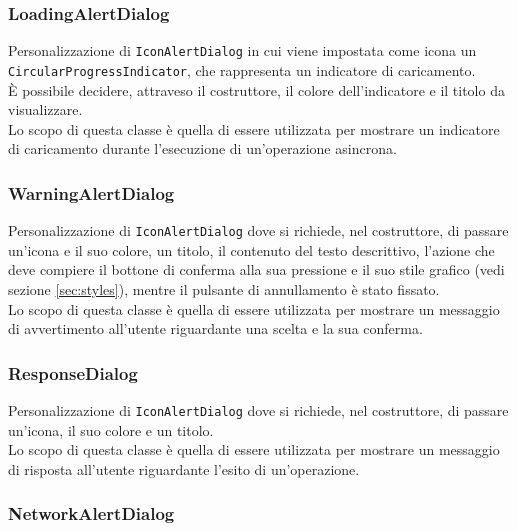 \subsubsection*{LoadingAlertDialog}
\label{subsubsec:loading-alert-dialog}

Personalizzazione di \lstinline{IconAlertDialog} in cui viene impostata come icona un \lstinline{CircularProgressIndicator}\cite{site:circular-progress-indicator}, che rappresenta un indicatore di caricamento.\\
È possibile decidere, attraveso il costruttore, il colore dell'indicatore e il titolo da visualizzare.\\
Lo scopo di questa classe è quella di essere utilizzata per mostrare un indicatore di caricamento durante l'esecuzione di un'operazione asincrona.\\

\subsubsection*{WarningAlertDialog}
\label{subsubsec:warning-alert-dialog}

Personalizzazione di \lstinline{IconAlertDialog} dove si richiede, nel costruttore, di passare un'icona e il suo colore, un titolo, il contenuto del testo descrittivo, l'azione che deve compiere il bottone di conferma alla sua pressione e il suo stile grafico (vedi sezione \ref{sec:styles}), mentre il pulsante di annullamento è stato fissato.\\
Lo scopo di questa classe è quella di essere utilizzata per mostrare un messaggio di avvertimento all'utente riguardante una scelta e la sua conferma.\\
\subsubsection*{ResponseDialog}
\label{subsubsec:response-dialog}

Personalizzazione di \lstinline{IconAlertDialog} dove si richiede, nel costruttore, di passare un'icona, il suo colore e un titolo.\\
Lo scopo di questa classe è quella di essere utilizzata per mostrare un messaggio di risposta all'utente riguardante l'esito di un'operazione.\\

\subsubsection*{NetworkAlertDialog}
\label{subsubsec:network-alert-dialog}


